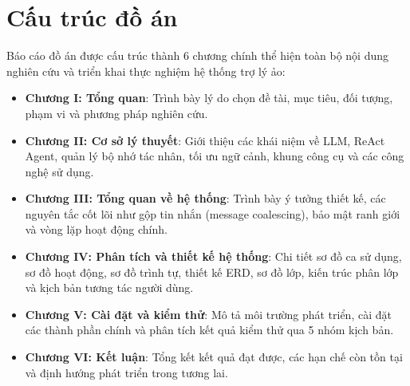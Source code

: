 \section{Cấu trúc đồ án}
Báo cáo đồ án được cấu trúc thành 6 chương chính thể hiện toàn bộ nội dung nghiên cứu và triển khai thực nghiệm hệ thống trợ lý ảo:
\begin{itemize}
  \item \textbf{Chương I: Tổng quan}: Trình bày lý do chọn đề tài, mục tiêu, đối tượng, phạm vi và phương pháp nghiên cứu.
  \item \textbf{Chương II: Cơ sở lý thuyết}: Giới thiệu các khái niệm về LLM, ReAct Agent, quản lý bộ nhớ tác nhân, tối ưu ngữ cảnh, khung công cụ và các công nghệ sử dụng.
  \item \textbf{Chương III: Tổng quan về hệ thống}: Trình bày ý tưởng thiết kế, các nguyên tắc cốt lõi như gộp tin nhắn (message coalescing), bảo mật ranh giới và vòng lặp hoạt động chính.
  \item \textbf{Chương IV: Phân tích và thiết kế hệ thống}: Chi tiết sơ đồ ca sử dụng, sơ đồ hoạt động, sơ đồ trình tự, thiết kế ERD, sơ đồ lớp, kiến trúc phân lớp và kịch bản tương tác người dùng.
  \item \textbf{Chương V: Cài đặt và kiểm thử}: Mô tả môi trường phát triển, cài đặt các thành phần chính và phân tích kết quả kiểm thử qua 5 nhóm kịch bản.
  \item \textbf{Chương VI: Kết luận}: Tổng kết kết quả đạt được, các hạn chế còn tồn tại và định hướng phát triển trong tương lai.
\end{itemize}
